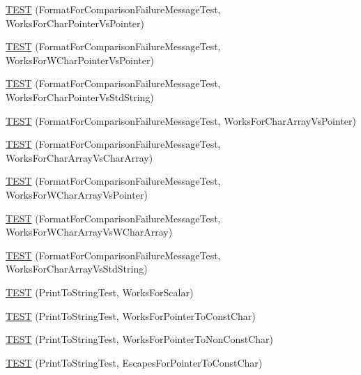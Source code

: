 \begin{DoxyCompactItemize}
\item 
\hyperlink{namespacetesting_1_1gtest__printers__test_a1694d4063da702f5379495d3cb2cbc91}{T\-E\-S\-T} (Format\-For\-Comparison\-Failure\-Message\-Test, Works\-For\-Char\-Pointer\-Vs\-Pointer)
\item 
\hyperlink{namespacetesting_1_1gtest__printers__test_a735171f4ba0a9dffee9c4c7321107822}{T\-E\-S\-T} (Format\-For\-Comparison\-Failure\-Message\-Test, Works\-For\-W\-Char\-Pointer\-Vs\-Pointer)
\item 
\hyperlink{namespacetesting_1_1gtest__printers__test_ab5a910170489276c14b817b70d4feb96}{T\-E\-S\-T} (Format\-For\-Comparison\-Failure\-Message\-Test, Works\-For\-Char\-Pointer\-Vs\-Std\-String)
\item 
\hyperlink{namespacetesting_1_1gtest__printers__test_ac25834e0463cf9f3d231db24e7b220e5}{T\-E\-S\-T} (Format\-For\-Comparison\-Failure\-Message\-Test, Works\-For\-Char\-Array\-Vs\-Pointer)
\item 
\hyperlink{namespacetesting_1_1gtest__printers__test_aba32640344f0186de5fbb6bb47e0c5a5}{T\-E\-S\-T} (Format\-For\-Comparison\-Failure\-Message\-Test, Works\-For\-Char\-Array\-Vs\-Char\-Array)
\item 
\hyperlink{namespacetesting_1_1gtest__printers__test_a1e95289500400eff5fdcd45c5864a6d2}{T\-E\-S\-T} (Format\-For\-Comparison\-Failure\-Message\-Test, Works\-For\-W\-Char\-Array\-Vs\-Pointer)
\item 
\hyperlink{namespacetesting_1_1gtest__printers__test_af4b502fb5745d2ee0bfb81d1c8eb95f6}{T\-E\-S\-T} (Format\-For\-Comparison\-Failure\-Message\-Test, Works\-For\-W\-Char\-Array\-Vs\-W\-Char\-Array)
\item 
\hyperlink{namespacetesting_1_1gtest__printers__test_ac2300073f401f783ff7b1ef97d2cbd6d}{T\-E\-S\-T} (Format\-For\-Comparison\-Failure\-Message\-Test, Works\-For\-Char\-Array\-Vs\-Std\-String)
\item 
\hyperlink{namespacetesting_1_1gtest__printers__test_a5d1bc4b12c18ccaec2ced9f45c092567}{T\-E\-S\-T} (Print\-To\-String\-Test, Works\-For\-Scalar)
\item 
\hyperlink{namespacetesting_1_1gtest__printers__test_a68100148758516ebab9c761ca7778586}{T\-E\-S\-T} (Print\-To\-String\-Test, Works\-For\-Pointer\-To\-Const\-Char)
\item 
\hyperlink{namespacetesting_1_1gtest__printers__test_a1db34d8760c17157572ce2877007d15a}{T\-E\-S\-T} (Print\-To\-String\-Test, Works\-For\-Pointer\-To\-Non\-Const\-Char)
\item 
\hyperlink{namespacetesting_1_1gtest__printers__test_ab8fce4287e837cfcd851ded56b62f9ce}{T\-E\-S\-T} (Print\-To\-String\-Test, Escapes\-For\-Pointer\-To\-Const\-Char)

\end{DoxyCompactItemize}
